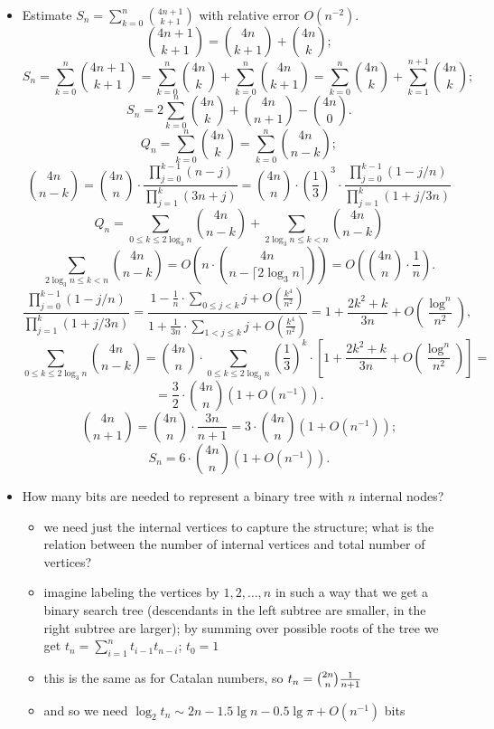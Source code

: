\documentclass[10pt, a4paper]{article}
\begin{document}
\begin{itemize}
\item Estimate $S_n=\sum_{k=0}^n \binom{4n+1}{k+1}$ with relative error $O(n^{-2})$.
$$\binom{4n+1}{k+1}=\binom{4n}{k+1}+\binom{4n}{k}; $$
$$S_n=\sum_{k=0}^n \binom{4n+1}{k+1}=\sum_{k=0}^n\binom{4n}{k}+ \sum_{k=0}^n\binom{4n}{k+1}=\sum_{k=0}^n\binom{4n}{k}+\sum_{k=1}^{n+1}\binom{4n}{k}; $$
$$S_n=2\sum_{k=0}^n\binom{4n}{k}+\binom{4n}{n+1}-\binom{4n}{0}.$$
$$Q_n=\sum_{k=0}^n\binom{4n}{k}=\sum_{k=0}^n\binom{4n}{n-k};$$
$$\binom{4n}{n-k}=\binom{4n}{n}\cdot\frac{\prod_{j=0}^{k-1}(n-j)}{\prod_{j=1}^{k}(3n+j)}=\binom{4n}{n}\cdot\left(\frac 13\right)^3\cdot\frac{\prod_{j=0}^{k-1}(1-j/n)}{\prod_{j=1}^{k}(1+j/3n)}$$
$$Q_n=\sum_{0\leq k\leq 2\log_3 n}\binom{4n}{n-k}+\sum_{2\log_3 n\leq k<n}\binom{4n}{n-k}$$
$$\sum_{2\log_3 n\leq k<n}\binom{4n}{n-k}=O\left(n\cdot\binom{4n}{n-\lceil 2\log_3 n\rceil} \right)=O\left(\binom{4n}{n}\cdot\frac 1n \right).$$
$$\frac{\prod_{j=0}^{k-1}(1-j/n)}{\prod_{j=1}^{k}(1+j/3n)}=\frac{1-\frac 1n\cdot\sum_{0\leq j<k}j+O\left(\frac{k^4}{n^2}\right)}{1+\frac{1}{3n}\cdot\sum_{1< j\leq k}j+O\left(\frac{k^4}{n^2}\right)} = 1+\frac{2k^2+k}{3n}+O\left(\frac{\log^n}{n^2}\right),$$
$$\sum_{0\leq k\leq 2\log_3 n}\binom{4n}{n-k}=\binom{4n}{n}\cdot\sum_{0\leq k\leq 2\log_3 n}\left( \frac 13\right)^k\cdot[1+\frac{2k^2+k}{3n}+O\left(\frac{\log^n}{n^2}\right)]=$$
$$=\frac 32\cdot \binom{4n}{n} (1+O(n^{-1})).$$
$$\binom{4n}{n+1}= \binom{4n}{n}\cdot\frac{3n}{n+1}=3\cdot\binom{4n}{n}(1+O(n^{-1}));$$
$$S_n=6\cdot\binom{4n}{n}(1+O(n^{-1})).$$

\item How many bits are needed to represent a binary tree with $n$ internal nodes?
\begin{itemize}
    \item we need just the internal vertices to capture the structure; what is the relation between the number of internal vertices and total number of vertices?
    \item imagine labeling the vertices by $1,2,\dots,n$ in such a way that we get a binary search tree (descendants in the left subtree are smaller, in the right subtree are larger);
        by summing over possible roots of the tree we get $t_n = \sum_{i=1}^n t_{i-1} t_{n-i}$; $t_0 = 1$
    \item this is the same as for Catalan numbers, so $t_n = {2n\choose n}{1\over n+1}$
    \item and so we need $\log_2 t_n \sim 2n - 1.5\lg n - 0.5 \lg \pi + O(n^{-1})$ bits
\end{itemize}

    
\end{itemize}
\end{document}

